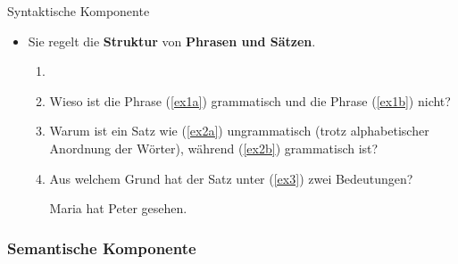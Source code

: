 \begin{frame}{Syntaktische Komponente}

\begin{itemize}
	\item Sie regelt die \textbf{Struktur} von \textbf{Phrasen und Sätzen}.

	\begin{enumerate}
		\item[]
		\item<2->[$\rightarrow$] Wieso ist die Phrase (\ref{ex1a}) grammatisch und die Phrase (\ref{ex1b}) nicht?
		
\eal
	\label{ex1a}
	\label{ex1b}
	\zl
		\item<3->[$\rightarrow$] Warum ist ein Satz wie (\ref{ex2a}) ungrammatisch (trotz alphabetischer Anordnung der Wörter), während (\ref{ex2b}) grammatisch ist?

\eal
	\label{ex2a}
	\label{ex2b}
	\zl
	
		\item<4->[$\rightarrow$] Aus welchem Grund hat der Satz unter (\ref{ex3}) zwei Bedeutungen? 

\ea Maria hat Peter gesehen.\label{ex3}
\z

	\end{enumerate}
			
\end{itemize}

\end{frame}


\subsubsection{Semantische Komponente}
		
